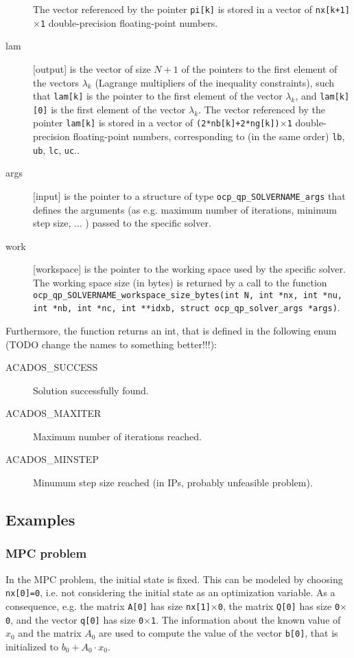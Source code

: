 \documentclass{report}
\begin{document}
\begin{description}
The vector referenced by the pointer {\tt pi[k]} is stored in a vector of {\tt nx[k+1]$\times$1} double-precision floating-point numbers.
\item[lam] [output] is the vector of size $N+1$ of the pointers to the first element of the vectors $\lambda_k$ (Lagrange multipliers of the inequality constraints), such that {\tt lam[k]} is the pointer to the first element of the vector $\lambda_k$, and {\tt lam[k][0]} is the first element of the vector $\lambda_k$.
The vector referenced by the pointer {\tt lam[k]} is stored in a vector of {\tt (2*nb[k]+2*ng[k])$\times$1} double-precision floating-point numbers, corresponding to (in the same order) {\tt lb}, {\tt ub}, {\tt lc}, {\tt uc}..
\item[args] [input] is the pointer to a structure of type {\tt ocp\_qp\_SOLVERNAME\_args} that defines the arguments (as e.g. maximum number of iterations, minimum step size, ... ) passed to the specific solver.
\item[work] [workspace] is the pointer to the working space used by the specific solver.
The working space size (in bytes) is returned by a call to the function {\tt ocp\_qp\_SOLVERNAME\_workspace\_size\_bytes(int N, int *nx, int *nu, int *nb, int *nc, int **idxb, struct ocp\_qp\_solver\_args *args)}. 
\end{description}

Furthermore, the function returns an int, that is defined in the following enum (TODO change the names to something better!!!):
\begin{description}
\item[ACADOS\_SUCCESS] Solution successfully found.
\item[ACADOS\_MAXITER] Maximum number of iterations reached.
\item[ACADOS\_MINSTEP] Minumum step size reached (in IPs, probably unfeasible problem).
\end{description}

\subsection{Examples}

\subsubsection{MPC problem}

In the MPC problem, the initial state is fixed.
This can be modeled by choosing {\tt nx[0]=0}, i.e. not considering the initial state as an optimization variable.
As a consequence, e.g. the matrix {\tt A[0]} has size {\tt nx[1]$\times$0}, the matrix {\tt Q[0]} has size {\tt 0$\times$0}, and the vector {\tt q[0]} has size {\tt 0$\times$1}.
The information about the known value of $x_0$ and the matrix $A_0$ are used to compute the value of the vector {\tt b[0]}, that is initialized to $b_0 + A_0 \cdot x_0$.
\end{document}
